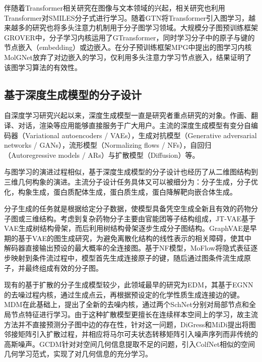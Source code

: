 伴随着Transformer\cite{transformer_vaswani_17}相关研究在图像与文本领域的兴起，相关研究\cite{smilestrans_honda_19,smilesbert_wang_19,chemberta_chithrananda_20}也利用Transformer对SMILES分子式进行学习。随着GTN\cite{gtn_yun_19}将Transformer引入图学习，越来越多的研究也将多头注意力机制用于分子图学习领域。大规模分子图预训练框架GROVER\cite{grover_rong_20}中，分子学习内核运用了GTransformer，同时学习分子中的原子与键的节点嵌入（embedding）或边嵌入。在分子预训练框架MPG\cite{mpg_li_21}中提出的图学习内核MolGNet放弃了对边嵌入的学习，仅利用多头注意力学习节点嵌入，结果证明了该图学习算法的有效性。

\subsection{基于深度生成模型的分子设计}
自深度学习研究兴起以来，深度生成模型一直是研究者重点研究的对象。作画、翻译、对话，渲染等应用能够直接服务于广大用户。主流的深度生成模型有变分自编码器（Variational autoencoders / VAEs）\cite{vae_kingma_13}，生成对抗模型（Generative adversarial networks / GANs）\cite{gan_goodfellow_14}，流形模型（Normalizing flows / NFs）\cite{nice_dinh_15,density_dinh_17}，自回归（Autoregressive models / ARs）\cite{ar_oord_16}与扩散模型（Diffusion）\cite{deepunsupervised_dickstein_15,generative_song_19}等。

与图学习的演进过程相似，基于深度生成模型的分子设计也经历了从二维图结构到三维几何构象的演进。主流分子设计任务具体又可以被细分为：分子生成，分子优化，构象生成，蛋白质配体生成，蛋白质生成，蛋白降解靶向嵌合体生成。

分子生成的任务就是根据给定分子数据，使模型具备凭空生成全新且有效的药物分子图或三维结构。考虑到复杂药物分子主要由官能团等子结构组成，JT-VAE\cite{jtvae_jin_18}基于VAE生成树结构骨架，而后利用树结构骨架逐步生成分子图结构。GraphVAE\cite{graphvae_simonovsky_18}是早期的基于VAE的图生成研究，为避免离散化结构的线性表示的相关障碍，使其中解码器直接输出预设的最大概率的全连接图。基于NF模型，MoFlow\cite{moflow_zang_20}将隐式表征逐步映射到条件流过程中，模型首先生成连接原子的键，随后通过图条件流生成原子，并最终组成有效的分子图。

现有的基于扩散的分子生成模型较少，此领域最早的研究为EDM\cite{edm_hoogeboom_22}，其基于EGNN\cite{egnn_satorras_21}的去噪过程内核，通过生成点云，再根据预设定的化学性质生成连接边的键。MDM\cite{mdm_huang_23}在此基础上，提出了全新的去噪内核，通过两个SchNet\cite{schnet_schutt_17}分别对局部节点和全局节点特征进行学习。由于这种扩散模型更擅长在连续样本空间上的学习，故主流方法并不直接预测分子图中边的存在性，针对这一问题，DiGress\cite{digress_vignac_22}和MiDi\cite{midi_vignac_23}提出将图邻接矩阵引入扩散过程，并相应将马尔可夫状态转移矩阵引入噪声序列而非传统的高斯噪声。GCDM\cite{gcdm_morehead_23}针对对空间几何信息提取不足的问题，引入ColfNet\cite{colfnet_du_22}相似的空间几何学习范式，实现了对几何信息的充分学习。

